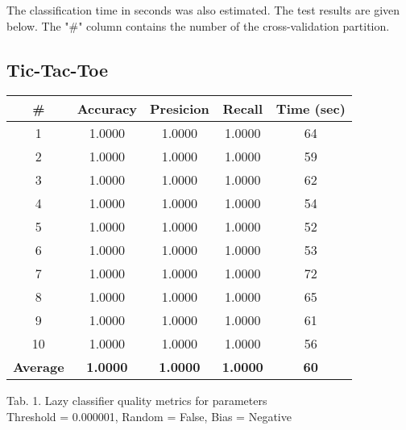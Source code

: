 \documentclass{article}
\begin{document}
The classification time in seconds was also estimated. The test results are given below. The "\#" column contains the number of the cross-validation partition.

\subsection{Tic-Tac-Toe}

\begin{center}
    \begin{tabular}{|c|c|c|c|c|}
        \hline
        \# & \textbf{Accuracy} & \textbf{Presicion} & \textbf{Recall} & \textbf{Time (sec)}  \\
        \hline
        1 & 1.0000 & 1.0000 & 1.0000 & 64 \\
        2 & 1.0000 & 1.0000 & 1.0000 & 59 \\
        3 & 1.0000 & 1.0000 & 1.0000 & 62 \\
        4 & 1.0000 & 1.0000 & 1.0000 & 54 \\
        5 & 1.0000 & 1.0000 & 1.0000 & 52 \\
        6 & 1.0000 & 1.0000 & 1.0000 & 53 \\
        7 & 1.0000 & 1.0000 & 1.0000 & 72 \\
        8 & 1.0000 & 1.0000 & 1.0000 & 65 \\
        9 & 1.0000 & 1.0000 & 1.0000 & 61 \\
        10 & 1.0000 & 1.0000 & 1.0000 & 56 \\
        \hline
        \textbf{Average} & \textbf{1.0000} & \textbf{1.0000} & \textbf{1.0000} & \textbf{60} \\
        \hline
    \end{tabular}
    
    Tab. 1. Lazy classifier quality metrics for parameters \\Threshold = 0.000001, Random = False, Bias = Negative
\end{center}
\end{document}
